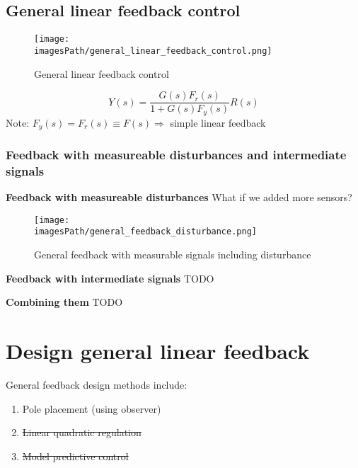 \documentclass{article}
\newcommand{\imagesPath}{images}
\begin{document}
\subsection{General linear feedback control}
\begin{figure}[!h]
    \centering
    \texttt{[image: \\imagesPath/general\_linear\_feedback\_control.png]}
    \caption{General linear feedback control}
    \label{fig:general_linear_feedback_control}
\end{figure}

\begin{equation*}
    Y(s) = \frac{G(s)F_r(s)}{1+G(s)F_y(s)}R(s)
\end{equation*}
Note: $F_y(s) = F_r(s) \equiv F(s) \Rightarrow$ simple linear feedback

\subsubsection{Feedback with measureable disturbances and intermediate signals}
\textbf{Feedback with measureable disturbances}
What if we added more sensors?
\begin{figure}[!h]
    \centering
    \texttt{[image: \\imagesPath/general\_feedback\_disturbance.png]}
    \caption{General feedback with measurable signals including disturbance}
    \label{fig:general_feedback_disturbance}
\end{figure}

\textbf{Feedback with intermediate signals}
TODO

\textbf{Combining them}
TODO


\section{Design general linear feedback}
General feedback design methods include:
\begin{enumerate}
    \item Pole placement (using observer)
    \item \sout{Linear quadratic regulation}
    \item \sout{Model predictive control}
\end{enumerate}
\end{document}
